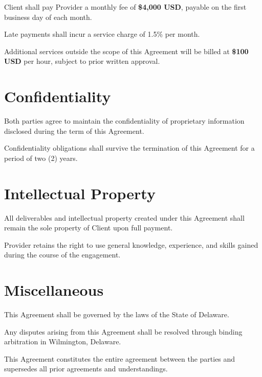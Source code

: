 \begin{compactenum}
	\item Client shall pay Provider a monthly fee of \textbf{\$4,000 USD}, payable on the first business day of each month.
	\item Late payments shall incur a service charge of 1.5\% per month.
	\item Additional services outside the scope of this Agreement will be billed at \textbf{\$100 USD} per hour, subject to prior written approval.
\end{compactenum}

\section{Confidentiality}

\begin{compactenum}
	\item Both parties agree to maintain the confidentiality of proprietary information disclosed during the term of this Agreement.
	\item Confidentiality obligations shall survive the termination of this Agreement for a period of two (2) years.
\end{compactenum}

\section{Intellectual Property}

\begin{compactenum}
	\item All deliverables and intellectual property created under this Agreement shall remain the sole property of Client upon full payment.
	\item Provider retains the right to use general knowledge, experience, and skills gained during the course of the engagement.
\end{compactenum}

\section{Miscellaneous}

\begin{compactenum}
	\item This Agreement shall be governed by the laws of the State of Delaware.
	\item Any disputes arising from this Agreement shall be resolved through binding arbitration in Wilmington, Delaware.
	\item This Agreement constitutes the entire agreement between the parties and supersedes all prior agreements and understandings.
\end{compactenum}


